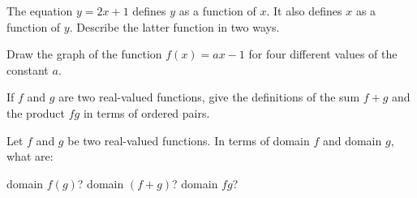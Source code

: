 \begin{exercises}
The equation $y=2x +1$ defines $y$ as a function of $x$.
It also defines $x$ as a function of $y$.
Describe the latter function in two ways.

Draw the graph of the function $f(x)=ax-1$ for four different values
of the constant $a$.

If $f$ and $g$ are two real-valued functions, give the definitions 
of the sum $f+g$ and the product $fg$ in terms of ordered pairs.

Let $f$ and $g$ be two real-valued functions.
In terms of domain $f$ and domain $g$, what are:
\begin{exenum}
\sx
domain $f(g)$?
\sx
domain $(f+g)$?
\sx
domain $fg$?
\end{exenum}

\end{exercises}
